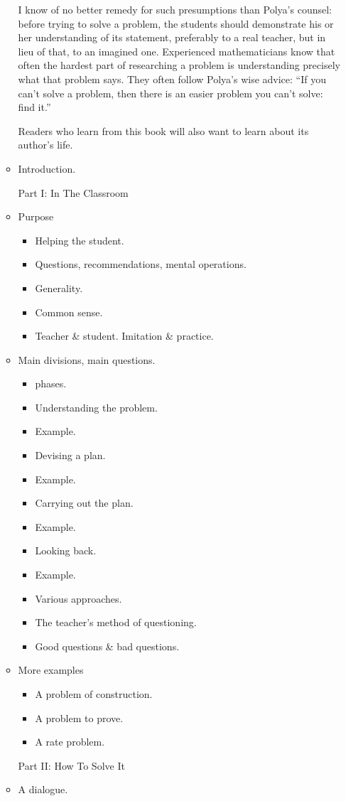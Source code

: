 \documentclass{article}
\begin{document}
\begin{enumerate}
\begin{itemize}
		I know of no better remedy for such presumptions than {\sc Polya}'s counsel: before trying to solve a problem, the students should demonstrate his or her understanding of its statement, preferably to a real teacher, but in lieu of that, to an imagined one. Experienced mathematicians know that often the hardest part of researching a problem is understanding precisely what that problem says. They often follow {\sc Polya}'s wise advice: ``If you can't solve a problem, then there is an easier problem you can't solve: find it.''
		
		Readers who learn from this book will also want to learn about its author's life.
		\item {\sf Introduction.}
		
		Part I: In The Classroom
		\item {\sf Purpose}
		\begin{itemize}
			\item {\sf Helping the student.}
			\item {\sf Questions, recommendations, mental operations.}
			\item {\sf Generality.}
			\item {\sf Common sense.}
			\item {\sf Teacher \& student. Imitation \& practice.}
		\end{itemize}
		\item {\sf Main divisions, main questions.}
		\begin{itemize}
			\item { phases.}
			\item {\sf Understanding the problem.}
			\item {\sf Example.}
			\item {\sf Devising a plan.}
			\item {\sf Example.}
			\item {\sf Carrying out the plan.}
			\item {\sf Example.}
			\item {\sf Looking back.}
			\item {\sf Example.}
			\item {\sf Various approaches.}
			\item {\sf The teacher's method of questioning.}
			\item {\sf Good questions \& bad questions.}
		\end{itemize}
		\item {\sf More examples}
		\begin{itemize}
			\item {\sf A problem of construction.}
			\item {\sf A problem to prove.}
			\item {\sf A rate problem.}
		\end{itemize}
		Part II: How To Solve It
		\item {\sf A dialogue.}
		

\end{itemize}
\end{enumerate}
\end{document}
